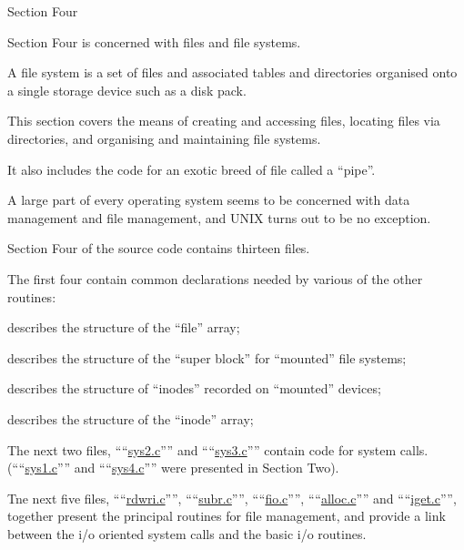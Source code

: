%
%
{\noindent \Large Section Four}

{\sf Section Four is concerned with files
and file systems.

A file system is a set of files and
associated tables and directories
organised onto a single storage device
such as a disk pack.

This section covers the means of
creating and accessing files,
locating files via directories, and
organising and maintaining
file systems.

It also includes the code for an exotic
breed of file called a ``pipe''.
}




A large part of every operating system
seems to be concerned with data management and file management, and UNIX
turns out to be no exception.


Section Four of the source code contains thirteen files.


The first four contain common declarations needed by various of the other
routines:

\bd
\item[``\href{./v6/file.h}{file.h}''] describes the structure
of the ``file'' array;

\item[``\href{./v6/filsvs.h}{filsvs.h}''] describes the structure
of the ``super block'' for ``mounted''
file systems;

\item[``\href{./v6/ino.h}{ino.h}''] describes the structure of
``inodes'' recorded on ``mounted''
devices;

\item[``\href{./v6/inode.h}{inode.h}''] describes the structure
of the ``inode'' array;
\ed

The next two files, ````\href{./v6/ken/sys2.c}{sys2.c}'''' and
````\href{./v6/ken/sys3.c}{sys3.c}'''' contain code for system calls.
(````\href{./v6/ken/sys1.c}{sys1.c}'''' and ````\href{./v6/ken/sys4.c}{sys4.c}'''' were presented
in Section Two).

Tne next five files, ````\href{./v6/ken/rdwri.c}{rdwri.c}'''',
````\href{./v6/ken/subr.c}{subr.c}'''', ````\href{./v6/ken/fio.c}{fio.c}'''', ````\href{./v6/ken/alloc.c}{alloc.c}'''' and
````\href{./v6/ken/iget.c}{iget.c}'''', together present the principal routines for file management, and
provide a link between the i/o oriented
system calls and the basic i/o routines.

